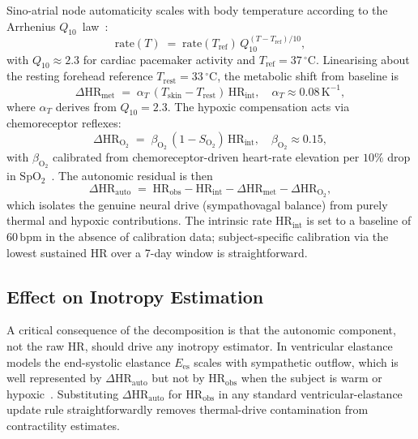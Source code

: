 \documentclass[10pt,twocolumn,a4paper]{article}
\theoremstyle{definition}
\newcommand{\SpO}{\mathrm{SpO_2}}
\newcommand{\Tskin}{T_{\mathrm{skin}}}
\newcommand{\HRobs}{\mathrm{HR}_{\mathrm{obs}}}
\newcommand{\HRint}{\mathrm{HR}_{\mathrm{int}}}
\newcommand{\dHRm}{\Delta\mathrm{HR}_{\mathrm{met}}}
\newcommand{\dHRo}{\Delta\mathrm{HR}_{\mathrm{O_2}}}
\newcommand{\dHRa}{\Delta\mathrm{HR}_{\mathrm{auto}}}
\newcommand{\Qten}{Q_{10}}
\newcommand{\Soxy}{S_{\mathrm{O_2}}}
\begin{document}
Sino-atrial node automaticity scales with body temperature according
to the Arrhenius $\Qten$~law~\cite{stevens1989q10,delgado2008}:
\begin{equation}
    \mathrm{rate}(T) \;=\; \mathrm{rate}(T_{\mathrm{ref}})\,\Qten^{(T-T_{\mathrm{ref}})/10},
\end{equation}
with $\Qten\approx 2.3$ for cardiac pacemaker activity and
$T_{\mathrm{ref}}=37\,^{\circ}\mathrm{C}$. Linearising about the
resting forehead reference $T_{\mathrm{rest}}=33\,^{\circ}\mathrm{C}$,
the metabolic shift from baseline is
\begin{equation}
    \dHRm \;=\; \alpha_{T}\,(\Tskin - T_{\mathrm{rest}})\,\HRint,
    \quad
    \alpha_{T} \approx 0.08\,\mathrm{K}^{-1},
    \label{eq:dHR-met}
\end{equation}
where $\alpha_{T}$ derives from $\Qten=2.3$. The hypoxic compensation
acts via chemoreceptor reflexes:
\begin{equation}
    \dHRo \;=\; \beta_{\mathrm{O_2}}\,(1 - \Soxy)\,\HRint,
    \quad
    \beta_{\mathrm{O_2}}\approx 0.15,
    \label{eq:dHR-o2}
\end{equation}
with $\beta_{\mathrm{O_2}}$ calibrated from chemoreceptor-driven
heart-rate elevation per $10\%$ drop in
$\SpO$~\cite{guyenet2014}. The autonomic residual is then
\begin{equation}
    \boxed{\;
    \dHRa \;=\; \HRobs - \HRint - \dHRm - \dHRo,
    \;}
    \label{eq:dHR-auto}
\end{equation}
which isolates the genuine neural drive (sympathovagal balance) from
purely thermal and hypoxic contributions. The intrinsic rate
$\HRint$ is set to a baseline of $60\,\mathrm{bpm}$ in the absence of
calibration data; subject-specific calibration via the lowest sustained
HR over a 7-day window is straightforward.

\subsection{Effect on Inotropy Estimation}

A critical consequence of the decomposition is that the autonomic
component, not the raw HR, should drive any inotropy estimator. In
ventricular elastance models the end-systolic elastance $E_{\mathrm{es}}$
scales with sympathetic outflow, which is well represented by
$\dHRa$ but not by $\HRobs$ when the subject is warm or
hypoxic~\cite{sagawa1988,burkhoff2007}. Substituting $\dHRa$ for
$\HRobs$ in any standard ventricular-elastance update rule
straightforwardly removes thermal-drive contamination from
contractility estimates.
\end{document}
